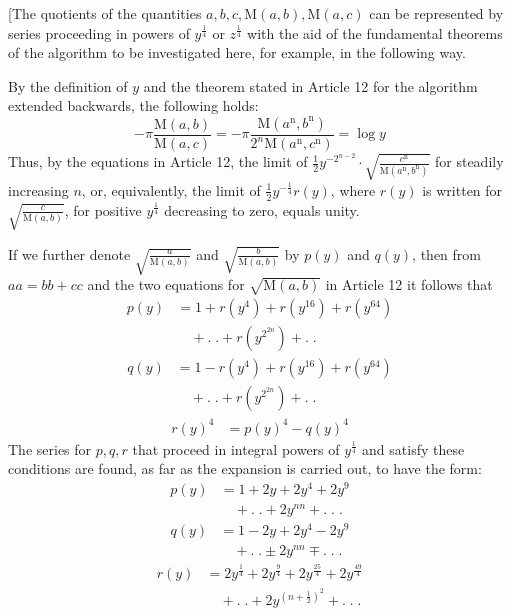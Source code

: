 [The quotients of the quantities $a,b,c,\mathrm M(a,b),\mathrm M(a,c)$ can be represented by series proceeding in powers of $y^{\frac14}$ or $z^{\frac14}$ with the aid of the fundamental theorems of the algorithm to be investigated here, for example, in the following way.

By the definition of $y$ and the theorem stated in Article 12 for the algorithm extended backwards, the following holds:
\[
-\pi\frac{\mathrm M(a,b)}{\mathrm M(a,c)}
=-\pi\frac{\mathrm M(a^{\mathrm n},b^{\mathrm n})}{2^n\mathrm M(a^{\mathrm n},c^{\mathrm n})}=\log y
\]
Thus, by the equations in Article 12, the limit of
$\frac12y^{-2^{n-2}}\cdot\surd{\frac{c^{\mathrm n}}{\mathrm M(a^{\mathrm n},b^{\mathrm n})}}$ for steadily increasing $n$, or, equivalently, the limit of $\frac12y^{-\frac14}r(y)$,
where $r(y)$ is written for $\surd{\frac{c}{\mathrm M(a,b)}}$, for positive $y^{\frac14}$ decreasing to zero, equals unity.

If we further denote $\surd{\frac{a}{\mathrm M(a,b)}}$ and $\surd{\frac{b}{\mathrm M(a,b)}}$ by $p(y)$ and $q(y)$, then from
$aa=bb+cc$ and the two equations for $\surd{\mathrm M(a,b)}$ in Article 12 it follows that
\[
\begin{aligned}p(y)&=1+r(y^4)+r(y^{16})+r(y^{64})\\&\quad+.\;.+r(y^{2^{2n}})+.\;.\end{aligned}
\]
\[
\begin{aligned}q(y)&=1-r(y^4)+r(y^{16})+r(y^{64})\\&\quad+.\;.+r(y^{2^{2n}})+.\;.\end{aligned}
\]
\[
\begin{aligned}r(y)^4&=p(y)^4-q(y)^4\end{aligned}
\]
The series for $p,q,r$ that proceed in integral powers of $y^{\frac14}$ and satisfy these conditions are found, as far as the expansion is carried out, to have the form:
\[
\begin{aligned}p(y)&=1+2y+2y^4+2y^9\\&\quad+.\;.+2y^{nn}+.\;.\;.\end{aligned}
\]
\[
\begin{aligned}q(y)&=1-2y+2y^4-2y^9\\&\quad+.\;.\pm2y^{nn}\mp.\;.\;.\end{aligned}
\]
\[
\begin{aligned}r(y)&=2y^{\frac14}+2y^{\frac94}+2y^{\frac{25}4}+2y^{\frac{49}4}\\&\quad+.\;.+2y^{(n+\frac12)^2}+.\;.\;.\end{aligned}
\]

